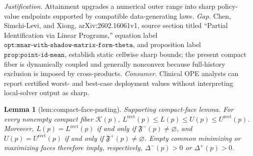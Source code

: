 \documentclass{article}
\newtheorem{lemma}{Lemma}
\begin{document}
\par\smallskip\noindent \textit{Justification.} Attainment upgrades a numerical outer range into sharp policy-value endpoints supported by compatible data-generating laws. \textit{Gap.} Chen, Simchi-Levi, and Xiong, arXiv:2602.16061v1, source section titled ``Partial Identification via Linear Programs,'' equation label \(\texttt{opt:mnar-with-shadow-matrix-form-theta}\), and proposition label \(\texttt{prop:point-id-mean}\), establish static cellwise sharp bounds; the present compact fiber is dynamically coupled and generally nonconvex because full-history exclusion is imposed by cross-products. \textit{Consumer.} Clinical OPE analysts can report certified worst- and best-case deployment values without interpreting local-solver output as sharp.

\begin{lemma}[lem:compact-face-pasting]\label{lem:compact-face-pasting}
Supporting compact-face lemma. For every nonempty compact fiber \(\mathcal K(p)\), \(L^{\mathrm{rect}}(p)\le L(p)\le U(p)\le U^{\mathrm{rect}}(p)\). Moreover, \(L(p)=L^{\mathrm{rect}}(p)\) if and only if \(\mathfrak F^-(p)\ne\varnothing\), and \(U(p)=U^{\mathrm{rect}}(p)\) if and only if \(\mathfrak F^+(p)\ne\varnothing\). Empty common minimizing or maximizing faces therefore imply, respectively, \(\Delta^-(p)>0\) or \(\Delta^+(p)>0\).
\end{lemma}
\end{document}
